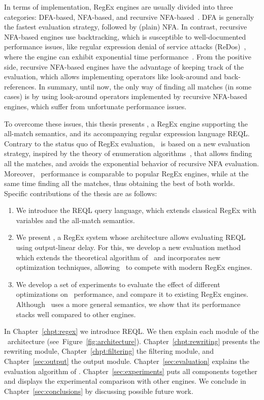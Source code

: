 In terms of implementation, RegEx engines are usually divided into three categories: DFA-based, NFA-based, and recursive NFA-based~\cite{cox2007regular}. DFA is generally the fastest evaluation strategy, followed by (plain) NFA. In contrast, recursive NFA-based engines use backtracking, which is susceptible to well-documented performance issues, like regular expression denial of service attacks (ReDos)~\cite{friedl2006mastering}, where the engine can exhibit exponential time performance~\cite{cox2007regular}. From the positive side, recursive NFA-based engines have the advantage of keeping track of the evaluation, which allows implementing operators like look-around and back-references.
In summary, until now, the only way of finding all matches (in some cases) is by using look-around operators implemented by recursive NFA-based engines, which suffer from unfortunate performance issues. 

To overcome these issues, this thesis presents \rematch, a RegEx engine supporting the all-match semantics, and its accompanying regular expression language REQL. Contrary to the status quo of RegEx evaluation, \rematch\ is based on a new evaluation strategy, inspired by the theory of enumeration algorithms~\cite{Segoufin13}, that allows finding all the matches, and avoids the exponential behavior of recursive NFA evaluation. Moreover, \rematch\ performance is comparable to popular RegEx engines, while at the same time finding all the matches, thus obtaining the best of both worlds. Specific contributions of the thesis are as follows:

\begin{enumerate}

\item  We introduce the REQL query language, which extends classical RegEx with variables and the all-match semantics.	

\item We present \rematch, a RegEx system whose architecture allows evaluating REQL using output-linear delay. For this, we develop a new evaluation method which extends the theoretical algorithm of~\cite{FlorenzanoRUVV20} and incorporates new optimization techniques, allowing \rematch\ to compete with modern RegEx engines. 

\item We develop a set of experiments to evaluate the effect of different optimizations on \rematch\ performance, and compare it to existing RegEx engines. Although \rematch\ uses a more general semantics, we show that its performance stacks well compared to other engines.
	
\end{enumerate}

In Chapter~\ref{chpt:regex} we introduce REQL. We then explain each module of the \rematch\ architecture (see~Figure~\ref{fig:architecture}). Chapter~\ref{chpt:rewriting} presents the rewriting module, Chapter~\ref{chpt:filtering} the filtering module, and Chapter~\ref{sec:output} the output module. Chapter~\ref{sec:evaluation} explains the evaluation algorithm of \rematch. Chapter~\ref{sec:experiments} puts all components together and displays the experimental comparison with other engines. We conclude in Chapter~\ref{sec:conclusions} by discussing possible future work. 
